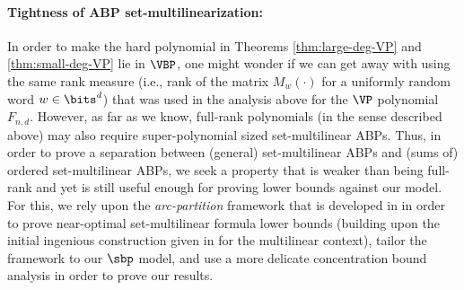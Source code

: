 \documentclass{article}
\begin{document}

\paragraph{Tightness of ABP set-multilinearization:}
In order to make the hard polynomial in Theorems \ref{thm:large-deg-VP} and \ref{thm:small-deg-VP} lie in $\VBP$, one might wonder if we can get away with using the same rank measure (i.e., rank of the matrix $M_w(\cdot)$ for a uniformly random word $w\in\bits^d$) that was used in the analysis above for the $\VP$ polynomial $F_{n,d}$. However, as far as we know, full-rank polynomials (in the sense described above) may also require super-polynomial sized set-multilinear ABPs. Thus, in order to prove a separation between (general)
set-multilinear ABPs and (sums of) ordered set-multilinear ABPs, we seek a property that is weaker than being full-rank and yet is still
useful enough for proving lower bounds against our model. For this, we rely upon the \emph{arc-partition} framework that is developed in \cite{KushS23} in order to prove near-optimal set-multilinear formula lower bounds (building upon the initial ingenious construction given in \cite{DvirMPY12} for the multilinear context), tailor the framework to our $\sbp$ model, and use a more delicate concentration bound analysis in order to prove our results.
\end{document}

